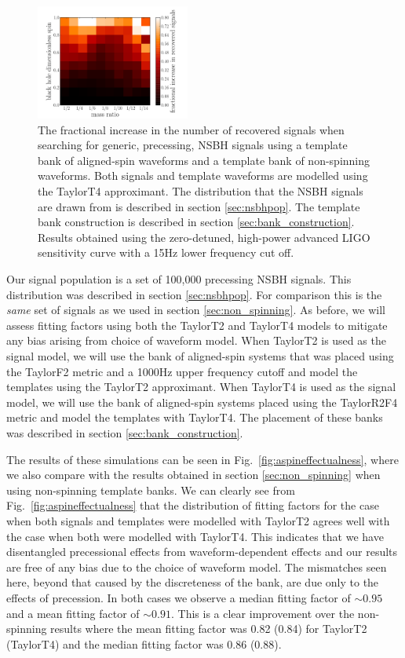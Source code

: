 \begin{figure}
\begin{center}
\includegraphics[width=0.45\textwidth]
{papers/nsbh_effectualness/figure15.pdf}
\end{center}
\caption{\label{fig:aspinimpr}
The fractional increase in the number of recovered signals when
searching for generic, precessing, NSBH signals using
a template bank of aligned-spin waveforms and a template bank of non-spinning
waveforms. Both signals and template waveforms are modelled using the TaylorT4
approximant. The distribution that the NSBH
signals are drawn from is described in section \ref{sec:nsbhpop}. The
template bank construction is described in section \ref{sec:bank_construction}.
Results obtained
using the zero-detuned, high-power advanced LIGO sensitivity curve with a 15Hz
lower frequency cut off.
}
\end{figure}

Our signal population is a set of 100,000 precessing \ac{NSBH} signals. This 
distribution was
described in section \ref{sec:nsbhpop}. For comparison this is the
\emph{same} set of signals as we used in section \ref{sec:non_spinning}.
As before, we will assess fitting factors using both the TaylorT2 and TaylorT4
models to mitigate any bias arising from choice of waveform model.
When TaylorT2 is used as the signal model, we will use the bank of aligned-spin
systems that was placed using the TaylorF2 metric and a 1000Hz
upper frequency cutoff and model the templates using the TaylorT2 approximant.
When TaylorT4 is used as the signal model, we will use the bank of aligned-spin
systems placed using the TaylorR2F4 metric and model the templates with
TaylorT4. The placement of these banks was described in section
\ref{sec:bank_construction}.

The results of these simulations can be seen in 
Fig.~\ref{fig:aspineffectualness}, where we also compare with the
results obtained in section \ref{sec:non_spinning} when using non-spinning
template banks. We can clearly see from Fig.~\ref{fig:aspineffectualness} that
the distribution of fitting factors for the
case when both signals and templates were modelled with TaylorT2 agrees well
with the case when both were modelled with TaylorT4. This indicates that
we have disentangled precessional effects from waveform-dependent effects and
our results are free of any bias due to the choice of waveform model.
The mismatches seen here, beyond that caused by the discreteness of the bank,
are due only to the effects of precession.
In both cases we observe a median fitting factor of
$\sim 0.95$ and a mean fitting factor of $\sim 0.91$. This is a clear
improvement
over the non-spinning results where the mean fitting factor was 0.82 (0.84) for
TaylorT2 (TaylorT4) and the median
fitting factor was 0.86 (0.88). 

